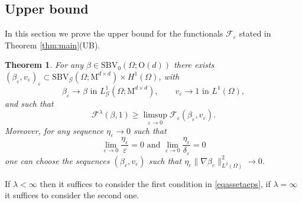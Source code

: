 \documentclass[a4paper,reqno]{amsart}
\newcommand{\SBVG}{\mathrm{SBV}_{\mathcal{G}}}
\newcommand\LG{{L}^1_\G}
\newcommand\eps{{\varepsilon}}
\newtheorem{theorem}[definition]{Theorem}
\theoremstyle{remark}
\def\e{\varepsilon}
\newcommand{\F}{\mathcal{F}}
\newcommand{\G}{\mathcal{G}}
\newcommand{\On}{\mathrm{O}(d)}
\newcommand{\Mno}{\mathrm{M}^{d\times d}}
\newcommand{\PC}{\mathrm{SBV}_0}
\numberwithin{equation}{section}
\begin{document}
\subsection{Upper bound}\label{Subsec:limsup}

In this section we prove the upper bound for the functionals $\F_\e$ stated in Theorem \ref{thm:main}(UB).

\begin{theorem}\label{th-upperbound}
	For any $\beta \in \PC(\Omega; \On)$ there exists $(\beta_\varepsilon, v_\varepsilon)_\varepsilon \subset \SBVG(\Omega;\Mno )\times H^1(\Omega)$, 
with 
\[
	\beta_\varepsilon \to \beta \text{ in }\LG(\Omega; \Mno),\qquad v_\varepsilon \to 1 \text{ in }L^1(\Omega),
\]
and  such that
	\begin{equation}\label{limsup}
		\F^\lambda(\beta,1)\geq \limsup_{\varepsilon \to 0} \F_\varepsilon(\beta_\varepsilon, v_\varepsilon).
	\end{equation}
Moreover, for any sequence $\eta_\eps\to0$ such that
		\begin{equation}\label{eqassetaeps}
			\lim_{\eps\to0}  \frac{\eta_\eps }\eps=0\text{ and }
\lim_{\eps\to0}  \frac{\eta_\eps}{\delta_\eps}=0%
		\end{equation}
		one can choose the sequences $(\beta_\e,v_\e)$  such that $\eta_\eps\|\nabla \beta_\eps\|_{L^2(\Omega)}^2\to0$.
\end{theorem}
If $\lambda<\infty$ then it suffices to consider the first condition in \eqref{eqassetaeps}, if $\lambda=\infty$ it suffices to consider the second one.
\end{document}
